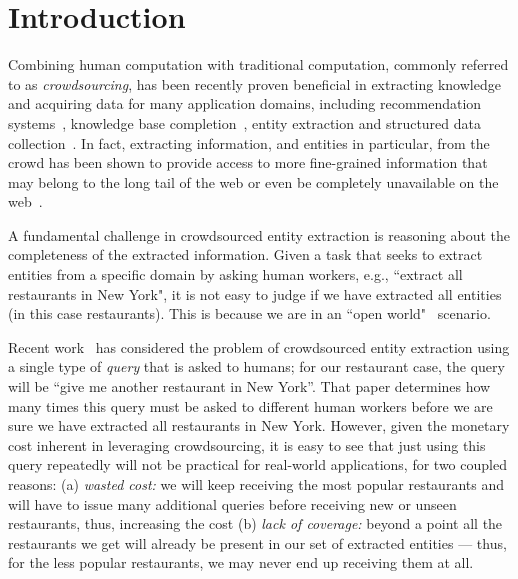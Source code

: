 


\section{Introduction}
\label{sec:intro}
Combining human computation with traditional computation, commonly referred to as {\em crowdsourcing}, has been recently proven beneficial in extracting knowledge and acquiring data for many application domains, including recommendation systems~\cite{amsterdamer:2014}, knowledge base completion~\cite{kondredi:2014}, entity extraction and structured data collection~\cite{park:2014,trushkowsky:2013}. In fact, extracting information, and entities in particular, from the crowd has been shown to provide access to more fine-grained information that may belong to the long tail of the web or even be completely unavailable on the web~\cite{franklin:2011, Parameswaran:2012, west:2014}.

A fundamental challenge in crowdsourced entity extraction is reasoning about the completeness of the extracted information. Given a task that seeks to extract entities from a specific domain by asking human workers, e.g., ``extract all restaurants in New York", it is not easy to judge if we have extracted all entities (in this case restaurants). This is because we are in an ``open world"~\cite{franklin:2011} scenario. 

Recent work~\cite{trushkowsky:2013} has considered the problem of crowdsourced entity extraction using a single type of {\em query} that is asked to humans; for our restaurant case, the query will be ``give me another restaurant in New York''. That paper determines how many times this query must be asked to different human workers before we are sure we have extracted all restaurants in New York. However, given the monetary cost inherent in leveraging crowdsourcing, it is easy to see that just using this query repeatedly will not be practical for real-world applications, for two coupled reasons: (a) {\em wasted cost:} we will keep receiving the most popular restaurants and will have to issue many additional queries before receiving new or unseen restaurants, thus, increasing the cost (b) {\em lack of coverage:}  beyond a point all the restaurants we get will already be present in our set of extracted entities --- thus, for the less popular restaurants, we may never end up receiving them at all.

